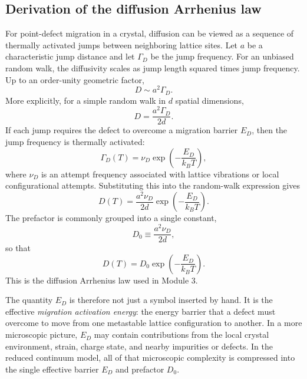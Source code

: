 \documentclass[11pt]{article}
\begin{document}
\subsection{Derivation of the diffusion Arrhenius law}

For point-defect migration in a crystal, diffusion can be viewed as a sequence of thermally activated jumps between neighboring lattice sites. Let $a$ be a characteristic jump distance and let $\Gamma_D$ be the jump frequency. For an unbiased random walk, the diffusivity scales as jump length squared times jump frequency. Up to an order-unity geometric factor,
\begin{equation}
D \sim a^2 \Gamma_D.
\end{equation}
More explicitly, for a simple random walk in $d$ spatial dimensions,
\begin{equation}
D = \frac{a^2 \Gamma_D}{2d}.
\end{equation}
If each jump requires the defect to overcome a migration barrier $E_D$, then the jump frequency is thermally activated:
\begin{equation}
\Gamma_D(T) = \nu_D \exp\left(-\frac{E_D}{k_B T}\right),
\end{equation}
where $\nu_D$ is an attempt frequency associated with lattice vibrations or local configurational attempts. Substituting this into the random-walk expression gives
\begin{equation}
D(T) = \frac{a^2 \nu_D}{2d} \exp\left(-\frac{E_D}{k_B T}\right).
\end{equation}
The prefactor is commonly grouped into a single constant,
\begin{equation}
D_0 \equiv \frac{a^2 \nu_D}{2d},
\end{equation}
so that
\begin{equation}
D(T) = D_0 \exp\left(-\frac{E_D}{k_B T}\right).
\end{equation}
This is the diffusion Arrhenius law used in Module 3.

The quantity $E_D$ is therefore not just a symbol inserted by hand. It is the effective \emph{migration activation energy}: the energy barrier that a defect must overcome to move from one metastable lattice configuration to another. In a more microscopic picture, $E_D$ may contain contributions from the local crystal environment, strain, charge state, and nearby impurities or defects. In the reduced continuum model, all of that microscopic complexity is compressed into the single effective barrier $E_D$ and prefactor $D_0$.
\end{document}
